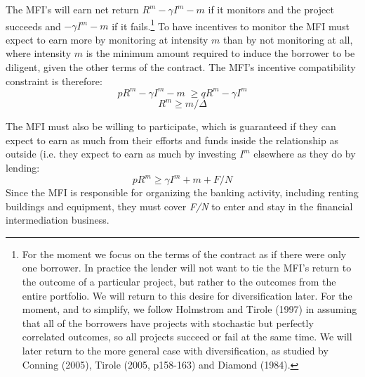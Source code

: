 \documentclass{article} %
\begin{document}
The MFI's will earn net return $R^{m} -\gamma I^{m} -m$ if it monitors and the project succeeds and $-\gamma I^{m} -m$ if it fails.\footnote{ For the moment we focus on the terms of the contract as if there were only one borrower.  In practice the lender will not want to tie the MFI's return to the outcome of a particular project, but rather to the outcomes from the entire portfolio.  We will return to this desire for diversification later.  For the moment, and to simplify, we follow Holmstrom and Tirole (1997) in assuming that all of the borrowers have projects with stochastic but perfectly correlated outcomes, so all projects succeed or fail at the same time.  We will later return to the more general case with diversification, as studied by Conning (2005), Tirole (2005, p158-163) and Diamond (1984). }  To have incentives to monitor the MFI must expect to earn more by monitoring at intensity $m$ than by not monitoring at all, where intensity $m$ is the minimum amount required to induce the borrower to be diligent, given the other terms of the contract.  The MFI's incentive compatibility constraint is therefore: 
\[pR^{m} -\gamma I^{m} -m\phantom{.} \ge qR^{m} -\gamma I^{m} \] 
\begin{equation} \label{ZEqnNum750204} 
R^{m} \ge m/\Delta  
\end{equation} 

The MFI must also be willing to participate, which is guaranteed if they can expect to earn as much from their efforts and funds inside the relationship as outside (i.e. they expect to earn as much by investing $I^{m} $ elsewhere as they do by lending: 
\begin{equation} \label{ZEqnNum427073} 
pR^{m} \ge \gamma I^{m} +m+F/N 
\end{equation} 
Since the MFI is responsible for organizing the banking activity, including renting buildings and equipment, they must cover \textit{F/N} to enter and stay in the financial intermediation business.  
\end{document}
